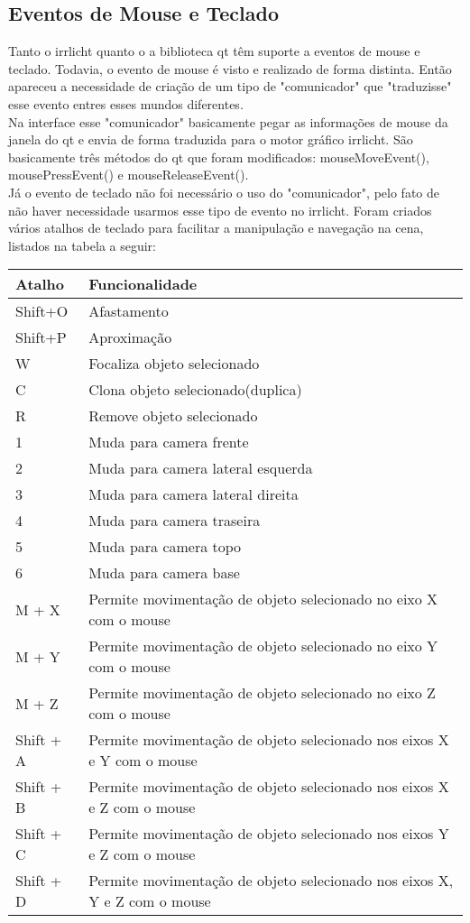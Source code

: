 	\subsection{Eventos de Mouse e Teclado}
	Tanto o irrlicht quanto o a biblioteca qt têm suporte a eventos de mouse e teclado. Todavia, o evento de mouse é visto e realizado de forma distinta. Então apareceu a necessidade de criação de um tipo de "comunicador" que "traduzisse" esse evento entres esses mundos diferentes.\\
	
	Na interface esse "comunicador" basicamente pegar as informações de mouse da janela do qt e envia de forma traduzida para o motor gráfico irrlicht. São basicamente três métodos do qt que foram modificados: mouseMoveEvent(), mousePressEvent() e mouseReleaseEvent().\\
	
	Já o evento de teclado não foi necessário o uso do "comunicador", pelo fato de não haver necessidade usarmos esse tipo de evento no irrlicht. Foram criados vários atalhos de teclado para facilitar a manipulação e navegação na cena, listados na tabela a seguir:
	
\begin{center}
\begin{tabular}{|l|l|}
    \hline
	Atalho & Funcionalidade \\ \hline
	Shift+O &  Afastamento\\ \hline
	Shift+P &  Aproximação\\ \hline
	W & Focaliza objeto selecionado\\ \hline
	C & Clona objeto selecionado(duplica)\\ \hline
	R & Remove objeto selecionado \\ \hline
	1 & Muda para camera frente \\ \hline
	2 & Muda para camera lateral esquerda \\ \hline
	3 & Muda para camera lateral direita \\ \hline
	4 & Muda para camera traseira \\ \hline
	5 & Muda para camera topo \\ \hline
	6 & Muda para camera base \\ \hline
	M + X & Permite movimentação de objeto selecionado no eixo X com o mouse \\ \hline
	M + Y & Permite movimentação de objeto selecionado no eixo Y com o mouse \\ \hline
	M + Z & Permite movimentação de objeto selecionado no eixo Z com o mouse \\ \hline
	Shift + A & Permite movimentação de objeto selecionado nos eixos X e Y com o mouse \\ \hline
	Shift + B & Permite movimentação de objeto selecionado nos eixos X e Z com o mouse \\ \hline
	Shift + C & Permite movimentação de objeto selecionado nos eixos Y e Z com o mouse \\ \hline
	Shift + D & Permite movimentação de objeto selecionado nos eixos X, Y e Z com o mouse \\ 
    \hline
\end{tabular}
\end{center}
	
